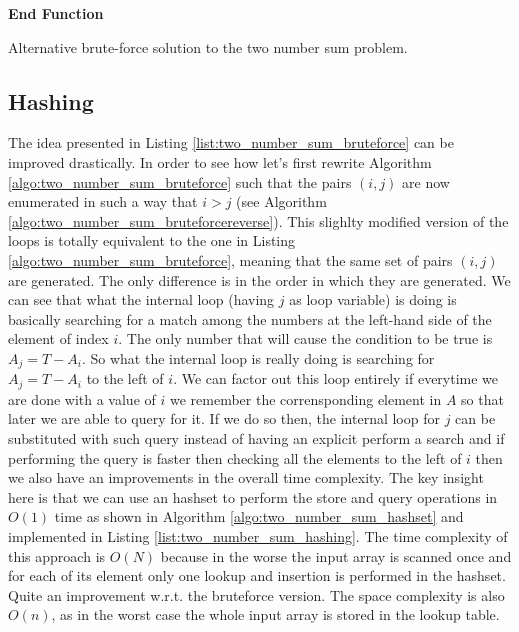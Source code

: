 \begin{algorithm}
	\SetAlgoLined {}
	
	 

	\textbf{End Function}
	\caption{Alternative brute-force solution to the two number sum problem.}
	\label{algo:two_number_sum_bruteforcereverse}
\end{algorithm}

\subsection{Hashing}
\label{sec:two_numbers:hashing}
The idea presented in Listing \ref{list:two_number_sum_bruteforce} can be improved drastically. In
order to see how let's first rewrite Algorithm  \ref{algo:two_number_sum_bruteforce} such that the
pairs $(i,j)$ are now enumerated in such a way that $i > j$ (see Algorithm
\ref{algo:two_number_sum_bruteforcereverse}). This slighlty modified version of the loops is totally
equivalent to the one in Listing \ref{algo:two_number_sum_bruteforce}, meaning that the same set of
pairs $(i,j)$ are generated. 
The only difference is in the order in which they are generated. 
We can see that what the internal loop (having $j$ as loop variable) is doing is basically searching for a
match among the numbers at the left-hand side of the element of index $i$. The only number that will
cause the  condition to be true is $A_j = T - A_i$. 
So what the internal loop is really doing is searching for $A_j = T - A_i$ to the left of $i$.
We can factor out this loop entirely if everytime we are done with a value of $i$ we remember the corrensponding element in $A$
so that later we are able to query for it.
If we do so then, the internal loop for $j$ can be substituted with such query instead of having an explicit perform a search and 
if performing the query is faster then checking all the elements to the left of $i$ then we also have an improvements in the overall time complexity.
The key insight here is that we can use an hashset to perform the store and query operations in $O(1)$ time 
as shown in Algorithm \ref{algo:two_number_sum_hashset} and implemented in Listing \ref{list:two_number_sum_hashing}.
The time  complexity of this approach is $O(N)$ because in the worse the input array is scanned once and for each
of its element only one lookup and insertion is performed in the hashset. Quite an improvement w.r.t. the bruteforce version.
 The space complexity is also $O(n)$, as in the worst case the whole input array is stored in the lookup table.



